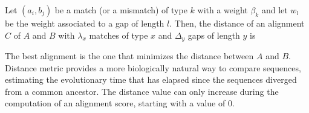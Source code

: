 Let $(a_i,b_j)$ be a match (or a mismatch) of type $k$ with a weight $\beta_k$ and let $w_l$ 
be the weight associated to a gap of length $l$. Then, the distance of an alignment $C$ of $A$ and
$B$ with $\lambda_x$ matches of type $x$ and $\Delta_y$ gaps of length $y$ is

\begin{center}
\end{center}

The best alignment is the one that minimizes the distance between $A$ and $B$. Distance metric 
provides a more biologically natural way to compare sequences, estimating the evolutionary time that has 
elapsed since the sequences diverged from a common ancestor. The distance value can only increase during 
the computation of an alignment score, starting with a value of $0$.


